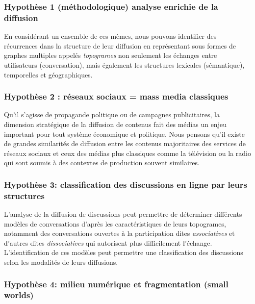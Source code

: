 \subsubsection{Hypoth\`ese 1 (m\'ethodologique) analyse enrichie de la diffusion} 

En consid\'erant un ensemble de ces m\`emes, nous pouvons identifier des r\'ecurrences dans la structure de leur diffusion en repr\'esentant sous formes de graphes multiples appel\'es \textit{topogrames} non seulement les \'echanges entre utilisateurs (conversation), mais \'egalement les structures lexicales (s\'emantique), temporelles et g\'eographiques.

\subsubsection{Hypoth\`ese 2 : r\'eseaux sociaux = mass media classiques} 

Qu{\textquoteright}il s{\textquoteright}agisse de propagande politique ou de campagnes publicitaires, la dimension strat\'egique de la diffusion de contenus fait des m\'edias un enjeu important pour tout syst\`eme \'economique et politique. Nous pensons qu{\textquoteright}il existe de grandes similarit\'es de diffusion entre les contenus majoritaires des services de r\'eseaux sociaux et ceux des m\'edias plus classiques comme la t\'el\'evision ou la radio qui sont soumis \`a des contextes de production souvent similaires.

\subsubsection{Hypoth\`ese 3: classification des discussions en ligne par leurs structures} 

L{\textquoteright}analyse de la diffusion de discussions peut permettre de d\'eterminer diff\'erents mod\`eles de conversations d{\textquoteright}apr\`es les caract\'eristiques de leurs topogrames, notamment des conversations ouvertes \`a la participation dites \textit{associatives }et d{\textquoteright}autres dites \textit{dissociatives} qui autorisent plus difficilement l{\textquoteright}\'echange. L{\textquoteright}identification de ces mod\`eles peut permettre une classification des discussions selon les modalit\'es de leurs diffusions.  

\subsubsection{Hypoth\`ese 4: milieu num\'erique et fragmentation (small worlds)} 

